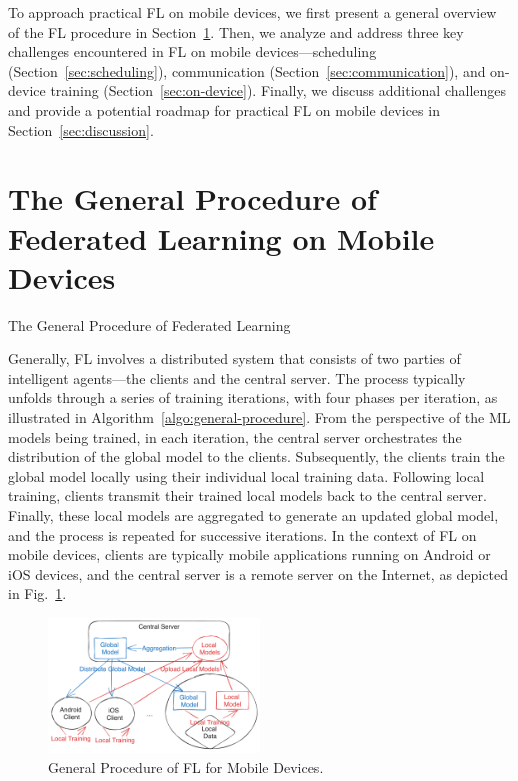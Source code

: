 \documentclass[conference]{IEEEtran}
\begin{document}
To approach practical FL on mobile devices,
we first present a general overview of the FL procedure in
Section~\ref{sec:general-procedure}.
Then, we analyze and address three key challenges encountered in
FL on mobile devices—scheduling (Section~\ref{sec:scheduling}),
communication (Section~\ref{sec:communication}), and
on-device training (Section~\ref{sec:on-device}).
Finally, we discuss additional challenges and
provide a potential roadmap for practical FL on mobile devices in
Section~\ref{sec:discussion}.

\section{The General Procedure of Federated Learning on Mobile Devices}

\label{sec:general-procedure}

\begin{algorithm}
  \caption{The General Procedure of Federated Learning}
  \label{algo:general-procedure}
\end{algorithm}

Generally, FL involves a distributed system that
consists of two parties of intelligent agents—the
clients and the central server.
The process typically unfolds through a series of training iterations,
with four phases per iteration,
as illustrated in Algorithm~\ref{algo:general-procedure}.
From the perspective of the ML models being trained,
in each iteration,
the central server orchestrates the distribution of the global model
to the clients.
Subsequently, the clients train the global model locally using
their individual local training data.
Following local training,
clients transmit their trained local models back to the central server.
Finally, these local models are aggregated to generate an updated global model,
and the process is repeated for successive iterations.
In the context of FL on mobile devices,
clients are typically mobile applications running on Android or iOS devices,
and the central server is a remote server on the Internet,
as depicted in Fig.~\ref{fig:general-fl}.

\begin{figure}
\centerline{
    \includegraphics[width=0.5\textwidth]{general-fl.png}
}
\caption{General Procedure of FL for Mobile Devices.}
\label{fig:general-fl}
\end{figure}
\end{document}
